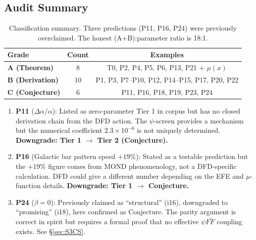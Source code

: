\documentclass[11pt]{article}
\begin{document}
\subsection{Audit Summary}

\begin{table}[h]
\centering
\begin{tabular}{lcc}
\toprule
\textbf{Grade} & \textbf{Count} & \textbf{Examples} \\
\midrule
\textbf{A (Theorem)} & 8 & T0, P2, P4, P5, P6, P13, P21 + $\mu(x)$ \\
\textbf{B (Derivation)} & 10 & P1, P3, P7--P10, P12, P14--P15, P17, P20, P22 \\
\textbf{C (Conjecture)} & 6 & P11, P16, P18, P19, P23, P24 \\
\bottomrule
\end{tabular}
\caption{Classification summary.  Three predictions (P11, P16, P24) were
previously overclaimed.  The honest (A+B):parameter ratio is 18:1.}
\end{table}

\begin{tcolorbox}[colback=red!5!white, colframe=red!60!black,
  title=\textbf{OVERCLAIMED PREDICTIONS}]
\begin{enumerate}
\item \textbf{P11} ($\Delta\alpha/\alpha$): Listed as zero-parameter Tier 1 in
  corpus but has no closed derivation chain from the DFD action.
  The $\psi$-screen provides a mechanism but the numerical coefficient
  $2.3 \times 10^{-6}$ is not uniquely determined.
  \textbf{Downgrade: Tier 1 $\to$ Tier 2 (Conjecture).}

\item \textbf{P16} (Galactic bar pattern speed $+19\%$): Stated as a
  testable prediction but the $+19\%$ figure comes from MOND
  phenomenology, not a DFD-specific calculation.  DFD could give
  a different number depending on the EFE and $\mu$-function details.
  \textbf{Downgrade: Tier 1 $\to$ Conjecture.}

\item \textbf{P24} ($\beta = 0$): Previously claimed as ``structural''
  (i16), downgraded to ``promising'' (i18), here confirmed as
  Conjecture.  The parity argument is correct in spirit but
  requires a formal proof that no effective $\psi F\tilde{F}$
  coupling exists.  See \S\ref{sec:S3CS}.
\end{enumerate}
\end{tcolorbox}


\end{document}

